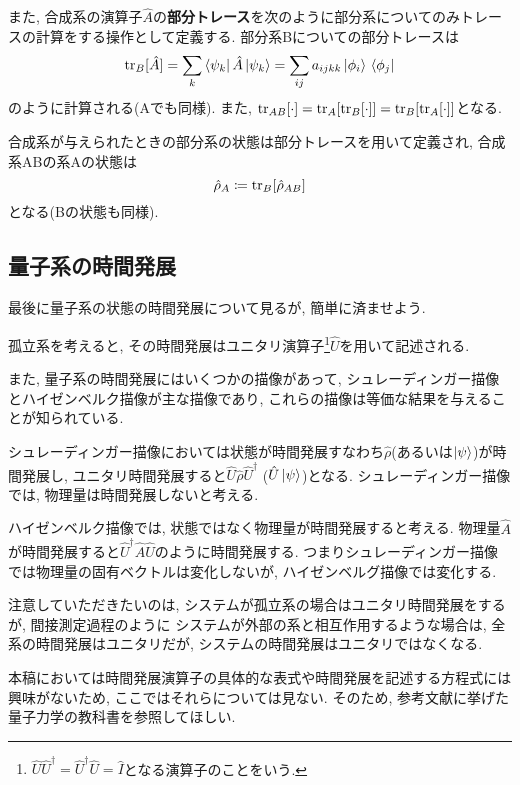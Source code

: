 また, 合成系の演算子\(\hat{A}\)の\textbf{部分トレース}を次のように部分系についてのみトレースの計算をする操作として定義する. 部分系Bについての部分トレースは
\begin{equation}
  \tr_{B}[\hat{A}]=\sum_k\bra{\psi_k}\hat{A}\ket{\psi_k}=\sum_{ij}a_{ijkk}\ket{\phi_i}\bra*{\phi_j}
\end{equation}
のように計算される(Aでも同様). また, \(\tr_{AB}[\cdot]=\tr_{A}[\tr_{B}[\cdot]]=\tr_B[\tr_A[\cdot]]\)となる.

合成系が与えられたときの部分系の状態は部分トレースを用いて定義され, 合成系ABの系Aの状態は
\begin{equation}
  \hat{\rho}_{A}\coloneqq\tr_{B}[\hat{\rho}_{AB}]
\end{equation}
となる(Bの状態も同様).

\subsection{量子系の時間発展}
最後に量子系の状態の時間発展について見るが, 簡単に済ませよう. 

孤立系を考えると, その時間発展はユニタリ演算子\footnote{\(\hat{U}\hat{U}^\dag=\hat{U}^\dag\hat{U}=\hat{I}\)となる演算子のことをいう.}\(\hat{U}\)を用いて記述される.  

また, 量子系の時間発展にはいくつかの描像があって, シュレーディンガー描像とハイゼンベルク描像が主な描像であり, これらの描像は等価な結果を与えることが知られている.

シュレーディンガー描像においては状態が時間発展すなわち\(\hat{\rho}\)(あるいは\(\ket{\psi}\))が時間発展し, ユニタリ時間発展すると\(\hat{U}\hat{\rho}\hat{U}^\dag\) (\(\hat{U}\ket{\psi}\))となる. シュレーディンガー描像では, 物理量は時間発展しないと考える.

ハイゼンベルク描像では, 状態ではなく物理量が時間発展すると考える. 物理量\(\hat{A}\)が時間発展すると\(\hat{U}^\dag\hat{A}\hat{U}\)のように時間発展する. つまりシュレーディンガー描像では物理量の固有ベクトルは変化しないが, ハイゼンベルグ描像では変化する.

注意していただきたいのは, システムが孤立系の場合はユニタリ時間発展をするが, 間接測定過程のように  
システムが外部の系と相互作用するような場合は, 全系の時間発展はユニタリだが, システムの時間発展はユニタリではなくなる. 

本稿においては時間発展演算子の具体的な表式や時間発展を記述する方程式には興味がないため, ここではそれらについては見ない. そのため, 参考文献に挙げた量子力学の教科書を参照してほしい.